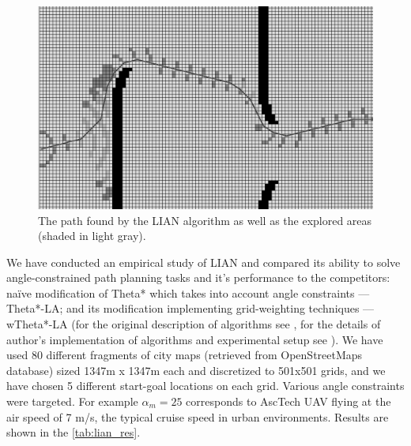 \documentclass[review]{elsarticle}
\begin{document}
\begin{figure}[h]
	\centering
		\includegraphics[width=\textwidth]{fig6.png}
	\caption{The path found by the LIAN algorithm as well as the explored areas (shaded in light gray).}
	\label{fig:grid}	
\end{figure}

We have conducted an empirical study of LIAN and compared its ability to solve angle-constrained path planning tasks and it’s performance to the competitors: naïve modification of Theta* which takes into account angle constraints --- Theta*-LA; and its modification implementing grid-weighting techniques --- wTheta*-LA (for the original description of algorithms see \cite{Kim2014}, for the details of author’s implementation of algorithms and experimental setup see \cite{Yakovlev2015b}). We have used 80 different fragments of city maps (retrieved from OpenStreetMaps \cite{OpenStreet} database) sized 1347m x 1347m each and discretized to 501x501 grids, and we have chosen 5 different start-goal locations on each grid. Various angle constraints were targeted. For example $\alpha_m=25$ corresponds to AscTech UAV flying at the air speed of 7 m/s, the typical cruise speed in urban environments. Results are shown in the \autoref{tab:lian_res}.

\begin{table}
	\caption{Comparative study of LIAN, Theta*-LA and wTheta*-LA path planning algorithms.}	
	\label{tab:lian_res}\scriptsize
\end{table}
\end{document}
